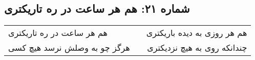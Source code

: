 \begin{center}
\section*{شماره ۲۱: هم هر ساعت در ره تاریکتری}
\label{sec:021}
\begin{longtable}{l p{0.5cm} r}
هم هر ساعت در ره تاریکتری
&&
هم هر روزی به دیده باریکتری
\\
هرگز چو به وصلش نرسد هیچ کسی
&&
چندانکه روی به هیچ نزدیکتری
\\
\end{longtable}
\end{center}
